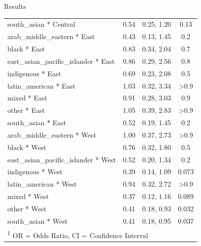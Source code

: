 \documentclass[
  ignorenonframetext,
]{beamer}
\begin{document}
\begin{frame}{Results}
\begin{longtable}{lccc}
\hspace{1em}south\_asian * Central & 0.54 & 0.25, 1.20 & 0.13\\
\hspace{1em}arab\_middle\_eastern * East & 0.43 & 0.13, 1.45 & 0.2\\
\hspace{1em}black * East & 0.83 & 0.34, 2.04 & 0.7\\
\hspace{1em}east\_asian\_pacific\_islander * East & 0.86 & 0.29, 2.56 & 0.8\\
\hspace{1em}indigenous * East & 0.69 & 0.23, 2.08 & 0.5\\
\hspace{1em}latin\_american * East & 1.03 & 0.32, 3.34 & >0.9\\
\hspace{1em}mixed * East & 0.91 & 0.28, 3.03 & 0.9\\
\hspace{1em}other * East & 1.05 & 0.39, 2.83 & >0.9\\
\hspace{1em}south\_asian * East & 0.52 & 0.19, 1.45 & 0.2\\
\hspace{1em}arab\_middle\_eastern * West & 1.00 & 0.37, 2.73 & >0.9\\
\hspace{1em}black * West & 0.76 & 0.32, 1.80 & 0.5\\
\hspace{1em}east\_asian\_pacific\_islander * West & 0.52 & 0.20, 1.34 & 0.2\\
\hspace{1em}indigenous * West & 0.39 & 0.14, 1.09 & 0.073\\
\hspace{1em}latin\_american * West & 0.94 & 0.32, 2.72 & >0.9\\
\hspace{1em}mixed * West & 0.37 & 0.12, 1.16 & 0.089\\
\hspace{1em}other * West & 0.41 & 0.18, 0.93 & 0.032\\
\hspace{1em}south\_asian * West & 0.41 & 0.18, 0.95 & 0.037\\*
\multicolumn{4}{l}{\rule{0pt}{1em}\textsuperscript{1} OR = Odds Ratio, CI = Confidence Interval}\\
\end{longtable}
\end{frame}
\end{document}
